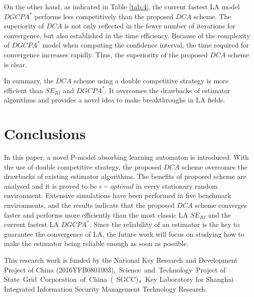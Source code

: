 On the other hand, as indicated in Table \ref{tab:4}, the current fastest LA model $DGCPA^{*}$ performs less competitively than the proposed $DCA$ scheme. The superiority of $DCA$ is not only reflected in the fewer number of iterations for convergence, but also established in the time efficiency. Because of the complexity of $DGCPA^{*}$ model when computing the confidence interval, the time required for convergence increases rapidly. Thus, the superiority of the proposed $DCA$ scheme is clear.

In summary, the $DCA$ scheme using a double competitive strategy is more efficient than $SE_{RI}$ and $DGCPA^{*}$. It overcomes the drawbacks of estimator algorithms and provides a novel idea to make breakthroughs in LA fields.

\section{Conclusions}
\label{sec:5}
In this paper, a novel P-model absorbing learning automaton is introduced. With the use of double competitive strategy, the proposed $DCA$ scheme overcomes the drawbacks of existing estimator algorithms. The benefits of proposed scheme are analysed and it is proved to be $\epsilon-optimal$ in every stationary random environment. Extensive simulations have been performed in five benchmark environments, and the results indicate that the proposed $DCA$ scheme converges faster and performs more efficiently than the most classic LA $SE_{RI}$ and the current fastest LA $DGCPA^{*}$. Since the reliability of an estimator is the key to guarantee the convergence of LA, the future work will focus on studying how to make the estimator being reliable enough as soon as possible.

\begin{acknowledgements}
This research work is funded by the National Key Research and Development Project of China (2016YFB0801003), Science and Technology Project of State Grid Corporation of China ( SGCC)，Key Laboratory for Shanghai Integrated Information Security Management Technology Research.
\end{acknowledgements}





